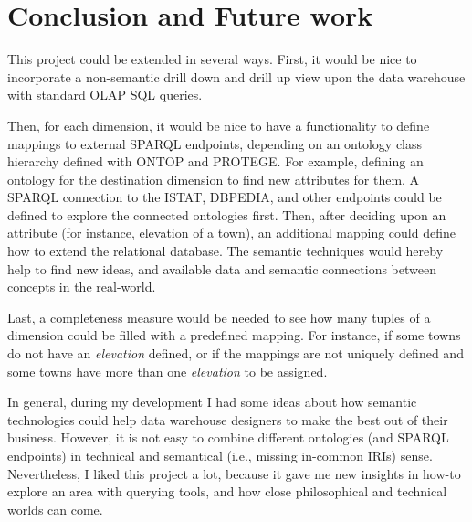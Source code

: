 
\section{Conclusion and Future work}
\label{chapter:conclusion}

This project could be extended in several ways. First, it would be nice to incorporate a non-semantic drill down and drill up view upon the data warehouse with standard OLAP SQL queries.

Then, for each dimension, it would be nice to have a functionality to define mappings to external SPARQL endpoints, depending on an ontology class hierarchy defined with ONTOP and PROTEGE. For example, defining an ontology for the destination dimension to find new attributes for them. A SPARQL connection to the ISTAT, DBPEDIA, and other endpoints could be defined to explore the connected ontologies first. Then, after deciding upon an attribute (for instance, elevation of a town), an additional mapping could define how to extend the relational database. The semantic techniques would hereby help to find new ideas, and available data and semantic connections between concepts in the real-world.

Last, a completeness measure would be needed to see how many tuples of a dimension could be filled with a predefined mapping. For instance, if some towns do not have an \textit{elevation} defined, or if the mappings are not uniquely defined and some towns have more than one \textit{elevation} to be assigned. 

In general, during my development I had some ideas about how semantic technologies could help data warehouse designers to make the best out of their business. However, it is not easy to combine different ontologies (and SPARQL endpoints) in technical and semantical (i.e., missing in-common IRIs) sense. Nevertheless, I liked this project a lot, because it gave me new insights in how-to explore an area with querying tools, and how close philosophical and technical worlds can come.